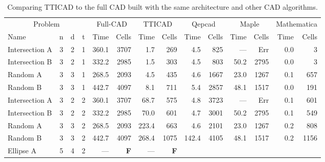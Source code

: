 \documentclass{article}
\begin{document}
\begin{sidewaystable*}
\caption{Comparing TTICAD to the full CAD built with the same architecture and other CAD algorithms.} \begin{center}
\label{table:CADW:TTICAD}
\begin{tabular}{lccc|rr|rr|rr|rr|rr}
  \multicolumn{4}{c|}{Problem} 
& \multicolumn{2}{|c|}{Full-CAD} & \multicolumn{2}{|c|}{TTICAD} 
& \multicolumn{2}{|c|}{{\sc Qepcad}} & \multicolumn{2}{|c|}{{\sc Maple}}  
& \multicolumn{2}{|c}{{\sc Mathematica}} \\
Name & n & d & t
                        &  Time      &  Cells      &  Time      &  Cells       
                        &  Time      &  Cells      &  Time      &  Cells       
                        &  Time      &  Cells \\
\hline
Intersection A          & 3 & 2 & 1
						& 360.1     &  3707       &  1.7       &  269         
						& 4.5       &  825        &  ---       &  Err     
						& 0.0 & 3   \\
Intersection B          & 3 & 2 & 1
						& 332.2     &  2985       &  1.5       &  303         
						& 4.5       &  803        &  50.2      &  2795    
						& 0.0 & 3   \\
Random A                & 3 & 3 & 1
						& 268.5     &  2093       &  4.5       &  435         
						& 4.6       &  1667       &  23.0      &  1267    
						& 0.1 & 657 \\
Random B                & 3 & 3 & 1
						& 442.7     &  4097       &  8.1       &  711         
						& 5.4       &  2857       &  48.1      &  1517    
						& 0.0 & 191 \\ 
Intersection A & 3 & 2 & 2
						&  360.1     &  3707       &  68.7      &  575         
						&  4.8       &  3723       &  ---       &  Err     
						& 0.1 & 601 \\
Intersection B & 3 & 2 & 2
						&  332.2     &  2985       &  70.0      &  601         
						&  4.7       &  3001       &  50.2      &  2795    
						& 0.1 & 549 \\
Random A       & 3 & 3 & 2
						&  268.5     &  2093       &  223.4     &  663         
						&  4.6       &  2101       &  23.0      &  1267    
						& 0.2 & 808 \\
Random B       & 3 & 3 & 2
						&  442.7     &  4097       &  268.4     &  1075        
						&  142.4     &  4105       &  48.1      &  1517    
						& 0.2 & 1156 \\
Ellipse A      & 5 & 4 & 2
						&  ---       &  {\bf F}    &  ---       &  {\bf F}     

\end{tabular}
\end{center}
\end{sidewaystable*}
\end{document}
